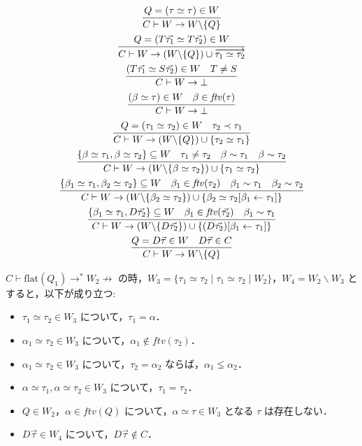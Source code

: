 \begin{gather*}
  \infer{
    C \vdash W \to W \backslash \{Q\}
  }{
    Q = (\tau \simeq \tau) \in W
  }
  \\
  \infer{
    C \vdash W \to (W \backslash \{Q\}) \cup \overrightarrow{\tau_1 \simeq \tau_2}
  }{
    Q = (T \vec{\tau_1} \simeq T \vec{\tau_2}) \in W
  }
  \\
  \infer{
    C \vdash W \to \bot
  }{
    (T \vec{\tau_1} \simeq S \vec{\tau_2}) \in W
    &
    T \neq S
  }
  \\
  \infer{
    C \vdash W \to \bot
  }{
    (\beta \simeq \tau) \in W
    &
    \beta \in \mathit{ftv}(\tau)
  }
  \\
  \infer{
    C \vdash W \to (W \backslash \{Q\}) \cup \{\tau_2 \simeq \tau_1\}
  }{
    Q = (\tau_1 \simeq \tau_2) \in W
    &
    \tau_2 \prec \tau_1
  }
  \\
  \infer{
    C \vdash W \to (W \backslash \{\beta \simeq \tau_2\}) \cup \{\tau_1 \simeq \tau_2\}
  }{
    \{\beta \simeq \tau_1, \beta \simeq \tau_2\} \subseteq W
    &
    \tau_1 \neq \tau_2
    &
    \beta \sim \tau_1
    &
    \beta \sim \tau_2
  }
  \\
  \infer{
    C \vdash W \to (W \backslash \{\beta_2 \simeq \tau_2\}) \cup \{\beta_2 \simeq \tau_2[\beta_1 \assign \tau_1]\}
  }{
    \{\beta_1 \simeq \tau_1, \beta_2 \simeq \tau_2\} \subseteq W
    &
    \beta_1 \in \mathit{ftv}(\tau_2)
    &
    \beta_1 \sim \tau_1
    &
    \beta_2 \sim \tau_2
  }
  \\
  \infer{
    C \vdash W \to (W \backslash \{D \vec{\tau_2}\}) \cup \{(D \vec{\tau_2})[\beta_1 \assign \tau_1]\}
  }{
    \{\beta_1 \simeq \tau_1, D \vec{\tau_2}\} \subseteq W
    &
    \beta_1 \in \mathit{ftv}(\vec{\tau_2})
    &
    \beta_1 \sim \tau_1
  }
  \\
  \infer{
    C \vdash W \to W \backslash \{Q\}
  }{
    Q = D \vec{\tau} \in W
    &
    D \vec{\tau} \in C
  }
\end{gather*}

\begin{lemma}
  $C \vdash \mathrm{flat}(Q_1) \to^* W_2 \mathrel{\not\to}$ の時，$W_3 = \{\tau_1 \simeq \tau_2 \mid \tau_1 \simeq \tau_2 \mid W_2\}$，$W_4 = W_2 \backslash W_3$ とすると，以下が成り立つ:
  \begin{itemize}
    \item $\tau_1 \simeq \tau_2 \in W_3$ について，$\tau_1 = \alpha$．
    \item $\alpha_1 \simeq \tau_2 \in W_3$ について，$\alpha_1 \not\in \mathit{ftv}(\tau_2)$．
    \item $\alpha_1 \simeq \tau_2 \in W_3$ について，$\tau_2 = \alpha_2$ ならば，$\alpha_1 \lneq \alpha_2$．
    \item $\alpha \simeq \tau_1, \alpha \simeq \tau_2 \in W_3$ について，$\tau_1 = \tau_2$．
    \item $Q \in W_2$，$\alpha \in \mathit{ftv}(Q)$ について，$\alpha \simeq \tau \in W_3$ となる $\tau$ は存在しない．
    \item $D \vec{\tau} \in W_4$ について，$D \vec{\tau} \not\in C$．
  \end{itemize}
\end{lemma}

